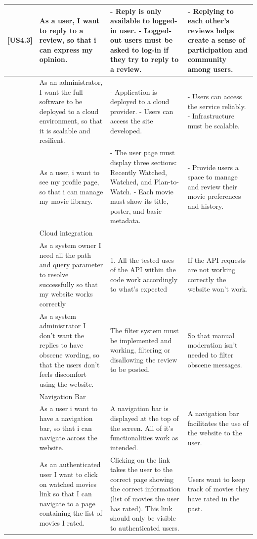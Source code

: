 \documentclass{article}
\begin{document}
\begin{longtable}{|p{1cm}|p{3cm}|p{6cm}|p{6cm}|}
[US4.3] & As a user, I want to reply to a review, so that i can express my opinion. & - Reply is only available to logged-in user. - Logged-out users must be asked to log-in if they try to reply to a review. & - Replying to each other's reviews helps create a sense of participation and community among users. \\ \hline
[US8.1] & As an administrator, I want the full software to be deployed to a cloud environment, so that it is scalable and resilient. & - Application is deployed to a cloud provider. - Users can access the site developed. & - Users can access the service reliably. - Infrastructure must be scalable. \\ \hline
[US9.1] & As a user, i want to see my profile page, so that i can manage my movie library. & - The user page must display three sections: Recently Watched, Watched, and Plan-to-Watch. - Each movie must show its title, poster, and basic metadata. & - Provide users a space to manage and review their movie preferences and history. \\ \hline
[US8] & Cloud integration &  &  \\ \hline
[US6.1] & As a system owner I need all the path and query parameter to resolve successfully so that my website works correctly & 1. All the tested uses of the API within the code work accordingly to what's expected & If the API requests are not working correctly the website won't work. \\ \hline
[US4.4] & As a system administrator I don't want the replies to have obscene wording, so that the users don't feels discomfort using the website. & The filter system must be implemented and working, filtering or disallowing the review to be posted. & So that manual moderation isn't needed to filter obscene messages. \\ \hline
[US10] & Navigation Bar &  &  \\ \hline
[US10.1] & As a user i want to have a navigation bar, so that i can navigate across the website. & A navigation bar is displayed at the top of the screen. All of it's functionalities work as intended. & A navigation bar facilitates the use of the website to the user. \\ \hline
[US10.4] & As an authenticated user I want to click on watched movies link so that I can navigate to a page containing the list of movies I rated. & Clicking on the link takes the user to the correct page showing the correct information (list of movies the user has rated). This link should only be visible to authenticated users. & Users want to keep track of movies they have rated in the past. \\ \hline

\end{longtable}
\end{document}
